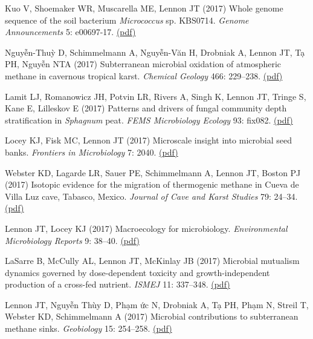\documentclass[11pt]{article}
\begin{document}
\begin{etaremune}
\item Kuo V, Shoemaker WR, Muscarella ME, Lennon JT (2017) Whole genome sequence of the soil bacterium \textit{Micrococcus} sp. KBS0714. \textit{Genome Announcements} 5: e00697-17. \href{https://lennonlab.github.io/assets/publications/Kuo_etal_2017.pdf}{(pdf)}

\item Nguyễn-Thuỳ D, Schimmelmann A, Nguyễn-Văn H, Drobniak A, Lennon JT, Tạ PH, Nguyễn NTA (2017) Subterranean microbial oxidation of atmospheric methane in cavernous tropical karst. \textit{Chemical Geology} 466: 229--238. \href{https://lennonlab.github.io/assets/publications/Nguyen-Thuy_etal_2017.pdf}{(pdf)}

\item Lamit LJ, Romanowicz JH, Potvin LR, Rivers A, Singh K, Lennon JT, Tringe S, Kane E, Lilleskov E (2017) Patterns and drivers of fungal community depth stratification in \textit{Sphagnum} peat. \textit{FEMS Microbiology Ecology} 93: fix082. \href{https://lennonlab.github.io/assets/publications/Lamit_etal_2017.pdf}{(pdf)}

\item Locey KJ, Fisk MC, Lennon JT (2017) Microscale insight into microbial seed banks. \textit{Frontiers in Microbiology} 7: 2040. \href{https://lennonlab.github.io/assets/publications/Locey_etal_2017.pdf}{(pdf)}

\item Webster KD, Lagarde LR, Sauer PE, Schimmelmann A, Lennon JT, Boston PJ (2017) Isotopic evidence for the migration of thermogenic methane in Cueva de Villa Luz cave, Tabasco, Mexico. \textit{Journal of Cave and Karst Studies} 79: 24–34. \href{https://lennonlab.github.io/assets/publications/Webster_etal_2017.pdf}{(pdf)}

\item Lennon JT, Locey KJ (2017) Macroecology for microbiology. \textit{Environmental Microbiology Reports} 9: 38–40. \href{https://lennonlab.github.io/assets/publications/Lennon_Locey_2017.pdf}{(pdf)}

\item LaSarre B, McCully AL, Lennon JT, McKinlay JB (2017) Microbial mutualism dynamics governed by dose-dependent toxicity and growth-independent production of a cross-fed nutrient. \textit{ISMEJ} 11: 337–348. \href{https://lennonlab.github.io/assets/publications/LaSarre_etal_2017.pdf}{(pdf)}

\item Lennon JT, Nguyễn Thùy D, Phạm \DJ{}ức N, Drobniak A, Tạ PH, Phạm N\DJ{}, Streil T, Webster KD, Schimmelmann A (2017) Microbial contributions to subterranean methane sinks. \textit{Geobiology} 15: 254--258. \href{https://lennonlab.github.io/assets/publications/Lennon_etal_2017.pdf}{(pdf)}


\end{etaremune}
\end{document}
